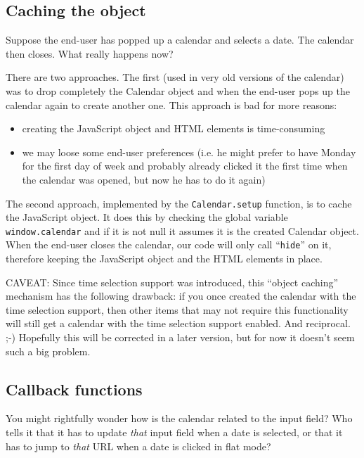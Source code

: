 \documentclass[a4paper,twoside,10pt]{dynadoc}
\begin{document}
\subsection{Caching the object}

Suppose the end-user has popped up a calendar and selects a date.  The calendar
then closes.  What really happens now?

There are two approaches.  The first (used in very old versions of the
calendar) was to drop completely the Calendar object and when the end-user pops
up the calendar again to create another one.  This approach is bad for more
reasons:

\begin{itemize}

\item creating the JavaScript object and HTML elements is time-consuming

\item we may loose some end-user preferences (i.e. he might prefer to have
Monday for the first day of week and probably already clicked it the first time
when the calendar was opened, but now he has to do it again)

\end{itemize}

The second approach, implemented by the \texttt{Calendar.setup} function, is to
cache the JavaScript object.  It does this by checking the global variable
\texttt{window.calendar} and if it is not null it assumes it is the created
Calendar object.  When the end-user closes the calendar, our code will only
call ``\texttt{hide}'' on it, therefore keeping the JavaScript object and the
HTML elements in place.

{\color{red} CAVEAT:} \quad Since time selection support was introduced, this
``object caching'' mechanism has the following drawback: if you once created
the calendar with the time selection support, then other items that may not
require this functionality will still get a calendar with the time selection
support enabled.  And reciprocal. ;-)  Hopefully this will be corrected in a
later version, but for now it doesn't seem such a big problem.

\subsection{Callback functions}

You might rightfully wonder how is the calendar related to the input field?
Who tells it that it has to update \emph{that} input field when a date is
selected, or that it has to jump to \emph{that} URL when a date is clicked in
flat mode?
\end{document}
